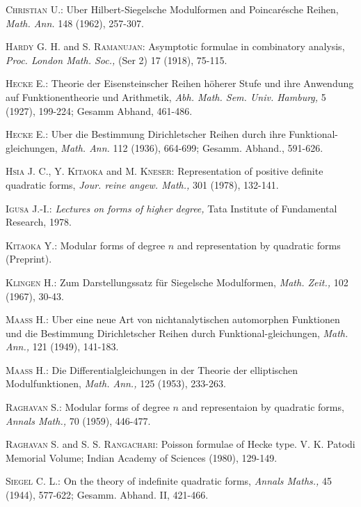 \begin{thebibliography}{99}
 \textsc{Christian U.:} Uber Hilbert-Siegelsche Modulformen and Poincar\'esche Reihen, \textit{Math. Ann.} 148 (1962), 257-307.

 \textsc{Hardy G. H.} and \textsc{S. Ramanujan:} Asymptotic formulae in combinatory analysis, \textit{Proc. London Math. Soc.,} (Ser 2) 17 (1918), 75-115.

 \textsc{Hecke E.:} Theorie der Eisensteinscher Reihen h\"oherer Stufe und ihre Anwendung auf Funktionentheorie und Arithmetik, \textit{Abh. Math. Sem. Univ. Hamburg,} 5 (1927), 199-224; Gesamm Abhand, 461-486.

 \textsc{Hecke E.:} Uber die Bestimmung Dirichletscher Reihen durch ihre Funktional-gleichungen, \textit{Math. Ann.} 112 (1936), 664-699; Gesamm. Abhand., 591-626.

 \textsc{Hsia J. C., Y. Kitaoka} and \textsc{M. Kneser:} Representation of positive definite quadratic forms, \textit{Jour. reine angew. Math.,} 301 (1978), 132-141.

 \textsc{Igusa J.-I.:} \textit{Lectures on forms of higher degree,} Tata Institute of Fundamental Research, 1978.

 \textsc{Kitaoka Y.:} Modular forms of degree $n$ and representation by quadratic forms (Preprint).

 \textsc{Klingen H.:} Zum Darstellungssatz f\"ur Siegelsche Modulformen, \textit{Math. Zeit.,} 102 (1967), 30-43.

 \textsc{Maass H.:} Uber eine neue Art von nichtanalytischen automorphen Funktionen und die Bestimmung Dirichletscher Reihen durch Funktional-gleichungen, \textit{Math. Ann.,} 121 (1949), 141-183.

 \textsc{Maass H.:} Die Differentialgleichungen in der Theorie der elliptischen Modulfunktionen, \textit{Math. Ann.,} 125 (1953), 233-263.

 \textsc{Raghavan S.:} Modular forms of degree $n$ and representaion by quadratic forms, \textit{Annals Math.,} 70 (1959), 446-477.

 \textsc{Raghavan S.} and \textsc{S. S. Rangachari:} Poisson formulae of Hecke type. V. K. Patodi Memorial Volume; Indian Academy of Sciences (1980), 129-149. 

 \textsc{Siegel C. L.:} On the theory of indefinite quadratic forms, \textit{Annals Maths.,} 45 (1944), 577-622; Gesamm. Abhand. II, 421-466.
\end{thebibliography}

















